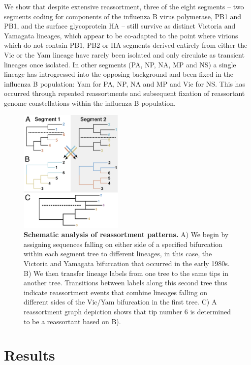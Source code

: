 \documentclass[11pt,oneside,letterpaper]{article}
\begin{document}
We show that despite extensive reassortment, three of the eight segments -- two segments coding for components of the influenza B virus polymerase, PB1 and PB1, and the surface glycoprotein HA -- still survive as distinct Victoria and Yamagata lineages, which appear to be co-adapted to the point where virions which do not contain PB1, PB2 or HA segments derived entirely from either the Vic or the Yam lineage have rarely been isolated and only circulate as transient lineages once isolated.
In other segments (PA, NP, NA, MP and NS) a single lineage has introgressed into the opposing background and been fixed in the influenza B population: Yam for PA, NP, NA and MP and Vic for NS.
This has occurred through repeated reassortments and subsequent fixation of reassortant genome constellations within the influenza B population.

\begin{figure}[h]
 \centering		
	\includegraphics[width=0.45\textwidth]{figures/TreeFigure2}
	\caption{\textbf{Schematic analysis of reassortment patterns.}
	A) We begin by assigning sequences falling on either side of a specified bifurcation within each segment tree to different lineages, in this case, the Victoria and Yamagata bifurcation that occurred in the early 1980s.
	B) We then transfer lineage labels from one tree to the same tips in another tree.
	Transitions between labels along this second tree thus indicate reassortment events that combine lineages falling on different sides of the Vic/Yam bifurcation in the first tree.
	C) A reassortment graph depiction shows that tip number 6 is determined to be a reassortant based on B).
	}
	\label{methodFig}
\end{figure}

\section*{Results}
\end{document}
